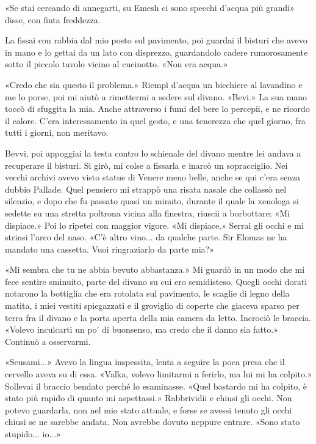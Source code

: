 «Se stai cercando di annegarti, su Emesh ci sono specchi d'acqua più
grandi» disse, con finta freddezza.

La fissai con rabbia dal mio posto sul pavimento, poi guardai il bisturi
che avevo in mano e lo gettai da un lato con disprezzo, guardandolo
cadere rumorosamente sotto il piccolo tavolo vicino al cucinotto. «Non
era acqua.»

«Credo che sia questo il problema.» Riempì d'acqua un bicchiere al
lavandino e me lo porse, poi mi aiutò a rimettermi a sedere sul divano.
«Bevi.» La sua mano toccò di sfuggita la mia. Anche attraverso i fumi
del bere lo percepii, e ne ricordo il calore. C'era interessamento in
quel gesto, e una tenerezza che quel giorno, fra tutti i giorni, non
meritavo.

Bevvi, poi appoggiai la testa contro lo schienale del divano mentre lei
andava a recuperare il bisturi. Si girò, mi colse a fissarla e inarcò un
sopracciglio. Nei vecchi archivi avevo visto statue di Venere meno
belle, anche se qui c'era senza dubbio Pallade. Quel pensiero mi strappò
una risata nasale che collassò nel silenzio, e dopo che fu passato quasi
un minuto, durante il quale la xenologa si sedette su una stretta
poltrona vicina alla finestra, riuscii a borbottare: «Mi dispiace.» Poi
lo ripetei con maggior vigore. «Mi dispiace.» Serrai gli occhi e mi
strinsi l'arco del naso. «C'è altro vino... da qualche parte. Sir Elomas
ne ha mandato una cassetta. Vuoi ringraziarlo da parte mia?»

«Mi sembra che tu ne abbia bevuto abbastanza.» Mi guardò in un modo che
mi fece sentire sminuito, parte del divano su cui ero semidisteso.
Quegli occhi dorati notarono la bottiglia che era rotolata sul
pavimento, le scaglie di legno della matita, i miei vestiti spiegazzati
e il groviglio di coperte che giaceva sparso per terra fra il divano e
la porta aperta della mia camera da letto. Incrociò le braccia. «Volevo
inculcarti un po' di buonsenso, ma credo che il danno sia fatto.»
Continuò a osservarmi.

«Scusami...» Avevo la lingua inspessita, lenta a seguire la poca presa
che il cervello aveva su di essa. «Valka, volevo limitarmi a ferirlo, ma
lui mi ha colpito.» Sollevai il braccio bendato perché lo esaminasse.
«Quel bastardo mi ha colpito, è stato più rapido di quanto mi
aspettassi.» Rabbrividii e chiusi gli occhi. Non potevo guardarla, non
nel mio stato attuale, e forse se avessi tenuto gli occhi chiusi se ne
sarebbe andata. Non avrebbe dovuto neppure entrare. «Sono stato
stupido... io...»


